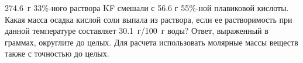 
274.6~г 33$\%$-ного раствора KF смешали с 56.6 г 55$\%$-ной плавиковой кислоты. Какая
масса осадка кислой соли выпала из раствора, если ее растворимость при данной
температуре составляет 30.1~г/100~г воды? Ответ, выраженный в граммах, округлите
до целых. Для расчета использовать молярные массы веществ также с точностью до
целых.


